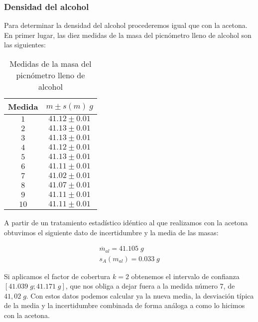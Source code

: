\documentclass[a4paper,12pt,titlepage]{article}
\begin{document}
\newpage

\subsubsection{Densidad del alcohol}

Para determinar la densidad del alcohol procederemos igual que con la acetona. En primer lugar, las diez medidas de la masa del picnómetro lleno de alcohol son las siguientes:

\begin{table}[h!]
    \centering
    \begin{tabular}{|c|c|}
    \hline
    Medida & $m \pm s(m) \: g$   \\ \hline
    $1$    & $41.12\pm0.01$ \\ \hline
    $2$    & $41.13\pm0.01$ \\ \hline
    $3$    & $41.13\pm0.01$ \\ \hline
    $4$    & $41.12\pm0.01$ \\ \hline
    $5$    & $41.13\pm0.01$ \\ \hline
    $6$    & $41.11\pm0.01$ \\ \hline
    $7$    & $41.02\pm0.01$ \\ \hline
    $8$    & $41.07\pm0.01$ \\ \hline
    $9$    & $41.11\pm0.01$ \\ \hline
    $10$   & $41.11\pm0.01$ \\ \hline
    \end{tabular}
    \caption{Medidas de la masa del picnómetro lleno de alcohol}
    \label{Masas Alcohol}
    \end{table}

A partir de un tratamiento estadístico idéntico al que realizamos con la acetona obtuvimos el siguiente dato de incertidumbre y la media de las masas:

\begin{gather}
    \overline{m}_{al} = 41.105 \; g \\
    s_{A}(m_{al}) =  0.033 \; g 
\end{gather}

Si aplicamos el factor de cobertura $k=2$ obtenemos el intervalo de confianza $[41.039 \; g ; 41.171 \; g]$, que nos obliga a dejar fuera a la medida número 7, de $41,02 \;g$. Con estos datos podemos calcular ya la nueva media, la desviación típica de la media y la incertidumbre combinada de forma análoga a como lo hicimos con la acetona.
\end{document}
